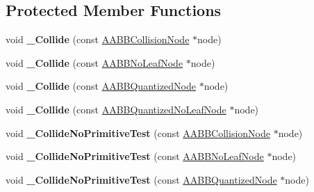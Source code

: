 \subsection*{Protected Member Functions}
\begin{DoxyCompactItemize}
\item 
void {\bfseries \+\_\+\+Collide} (const \hyperlink{classAABBCollisionNode}{A\+A\+B\+B\+Collision\+Node} $\ast$node)\hypertarget{classOBBCollider_a7990bab5c0031bcb1f9ff91e0784fb89}{}\label{classOBBCollider_a7990bab5c0031bcb1f9ff91e0784fb89}

\item 
void {\bfseries \+\_\+\+Collide} (const \hyperlink{classAABBNoLeafNode}{A\+A\+B\+B\+No\+Leaf\+Node} $\ast$node)\hypertarget{classOBBCollider_a8a0b06aac794cf0beeaf2f4655319f2b}{}\label{classOBBCollider_a8a0b06aac794cf0beeaf2f4655319f2b}

\item 
void {\bfseries \+\_\+\+Collide} (const \hyperlink{classAABBQuantizedNode}{A\+A\+B\+B\+Quantized\+Node} $\ast$node)\hypertarget{classOBBCollider_a9b112aeac7f0ec4475a7257359c038d7}{}\label{classOBBCollider_a9b112aeac7f0ec4475a7257359c038d7}

\item 
void {\bfseries \+\_\+\+Collide} (const \hyperlink{classAABBQuantizedNoLeafNode}{A\+A\+B\+B\+Quantized\+No\+Leaf\+Node} $\ast$node)\hypertarget{classOBBCollider_a03ade2e5058bc111c4595a1bfc2001bb}{}\label{classOBBCollider_a03ade2e5058bc111c4595a1bfc2001bb}

\item 
void {\bfseries \+\_\+\+Collide\+No\+Primitive\+Test} (const \hyperlink{classAABBCollisionNode}{A\+A\+B\+B\+Collision\+Node} $\ast$node)\hypertarget{classOBBCollider_a452f93a41ae9e7d0fa1b691cdf149841}{}\label{classOBBCollider_a452f93a41ae9e7d0fa1b691cdf149841}

\item 
void {\bfseries \+\_\+\+Collide\+No\+Primitive\+Test} (const \hyperlink{classAABBNoLeafNode}{A\+A\+B\+B\+No\+Leaf\+Node} $\ast$node)\hypertarget{classOBBCollider_a17db250fb7683f36dec64773d347a759}{}\label{classOBBCollider_a17db250fb7683f36dec64773d347a759}

\item 
void {\bfseries \+\_\+\+Collide\+No\+Primitive\+Test} (const \hyperlink{classAABBQuantizedNode}{A\+A\+B\+B\+Quantized\+Node} $\ast$node)\hypertarget{classOBBCollider_a0914b34907f08b5e7861737e10de573c}{}\label{classOBBCollider_a0914b34907f08b5e7861737e10de573c}


\end{DoxyCompactItemize}

